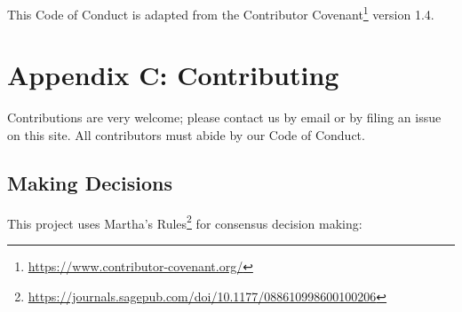\documentclass[krantzl]{krantz}
\newcommand{\hreffoot}[2]{{#1}\footnote{\href{#2}{#2}}}
\begin{document}
This Code of Conduct is adapted from the \hreffoot{Contributor Covenant}{https://www.contributor-covenant.org/} version 1.4.

\chapter{Appendix C: Contributing}\label{contributing}


Contributions are very welcome;
please contact us by email or by filing an issue on this site.
All contributors must abide by our Code of Conduct.

\section*{Making Decisions}


This project uses \hreffoot{Martha's Rules}{https://journals.sagepub.com/doi/10.1177/088610998600100206} for consensus decision making:
\end{document}
